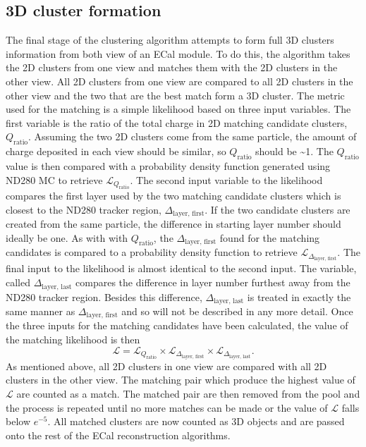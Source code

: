 \subsection{3D cluster formation}
\label{subsec:ECal3DMatching}
The final stage of the clustering algorithm attempts to form full 3D clusters information from both view of an ECal module.  To do this, the algorithm takes the 2D clusters from one view and matches them with the 2D clusters in the other view.  All 2D clusters from one view are compared to all 2D clusters in the other view and the two that are the best match form a 3D cluster.  The metric used for the matching is a simple likelihood based on three input variables.  The first variable is the ratio of the total charge in 2D matching candidate clusters, $Q_{\textrm{ratio}}$.  Assuming the two 2D clusters come from the same particle, the amount of charge deposited in each view should be similar, so $Q_{\textrm{ratio}}$ should be \sim1.  The $Q_{\textrm{ratio}}$ value is then compared with a probability density function generated using ND280 MC to retrieve $\mathcal{L}_{Q_{\textrm{ratio}}}$.  The second input variable to the likelihood compares the first layer used by the two matching candidate clusters which is closest to the ND280 tracker region, $\Delta_{\textrm{layer, first}}$.  If the two candidate clusters are created from the same particle, the difference in starting layer number should ideally be one.  As with with $Q_{\textrm{ratio}}$, the $\Delta_{\textrm{layer, first}}$ found for the matching candidates is compared to a probability density function to retrieve $\mathcal{L}_{\Delta_{\textrm{layer, first}}}$.  The final input to the likelihood is almost identical to the second input.  The variable, called $\Delta_{\textrm{layer, last}}$ compares the difference in layer number furthest away from the ND280 tracker region.  Besides this difference, $\Delta_{\textrm{layer, last}}$ is treated in exactly the same manner as $\Delta_{\textrm{layer, first}}$ and so will not be described in any more detail.
\newline
Once the three inputs for the matching candidates have been calculated, the value of the matching likelihood is then
\begin{equation}
  \mathcal{L} = \mathcal{L}_{Q_{\textrm{ratio}}} \times \mathcal{L}_{\Delta_{\textrm{layer, first}}} \times \mathcal{L}_{\Delta_{\textrm{layer, last}}}.
\end{equation}
As mentioned above, all 2D clusters in one view are compared with all 2D clusters in the other view.  The matching pair which produce the highest value of $\mathcal{L}$ are counted as a match.  The matched pair are then removed from the pool and the process is repeated until no more matches can be made or the value of $\mathcal{L}$ falls below $e^{-5}$.  All matched clusters are now counted as 3D objects and are passed onto the rest of the ECal reconstruction algorithms.

